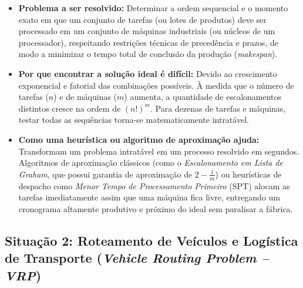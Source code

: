 \begin{itemize}
    \item \textbf{Problema a ser resolvido:} Determinar a ordem sequencial e o momento exato em que um conjunto de tarefas (ou lotes de produtos) deve ser processado em um conjunto de máquinas industriais (ou núcleos de um processador), respeitando restrições técnicas de precedência e prazos, de modo a minimizar o tempo total de conclusão da produção (\textit{makespan}).
    \item \textbf{Por que encontrar a solução ideal é difícil:} Devido ao crescimento exponencial e fatorial das combinações possíveis. À medida que o número de tarefas ($n$) e de máquinas ($m$) aumenta, a quantidade de escalonamentos distintos cresce na ordem de $(n!)^m$. Para dezenas de tarefas e máquinas, testar todas as sequências torna-se matematicamente intratável.
    \item \textbf{Como uma heurística ou algoritmo de aproximação ajuda:} Transformam um problema intratável em um processo resolvido em segundos. Algoritmos de aproximação clássicos (como o \textit{Escalonamento em Lista de Graham}, que possui garantia de aproximação de $2 - \frac{1}{m}$) ou heurísticas de despacho como \textit{Menor Tempo de Processamento Primeiro} (SPT) alocam as tarefas imediatamente assim que uma máquina fica livre, entregando um cronograma altamente produtivo e próximo do ideal sem paralisar a fábrica.
\end{itemize}

\subsection{Situação 2: Roteamento de Veículos e Logística de Transporte (\textit{Vehicle Routing Problem -- VRP})}

